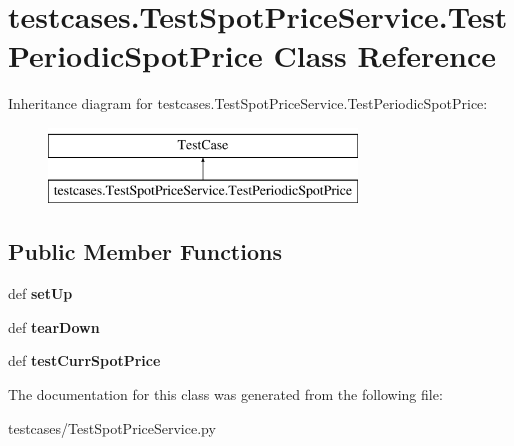 \hypertarget{classtestcases_1_1TestSpotPriceService_1_1TestPeriodicSpotPrice}{\section{testcases.\-Test\-Spot\-Price\-Service.\-Test\-Periodic\-Spot\-Price Class Reference}
\label{classtestcases_1_1TestSpotPriceService_1_1TestPeriodicSpotPrice}
}
Inheritance diagram for testcases.\-Test\-Spot\-Price\-Service.\-Test\-Periodic\-Spot\-Price\-:\begin{figure}[H]
\begin{center}
\leavevmode
\includegraphics[height=2.000000cm]{classtestcases_1_1TestSpotPriceService_1_1TestPeriodicSpotPrice}
\end{center}
\end{figure}
\subsection*{Public Member Functions}
\begin{DoxyCompactItemize}
\item 
\hypertarget{classtestcases_1_1TestSpotPriceService_1_1TestPeriodicSpotPrice_a829f8aaf88613f2900e72bfa7565fd83}{def {\bfseries set\-Up}}\label{classtestcases_1_1TestSpotPriceService_1_1TestPeriodicSpotPrice_a829f8aaf88613f2900e72bfa7565fd83}

\item 
\hypertarget{classtestcases_1_1TestSpotPriceService_1_1TestPeriodicSpotPrice_a79ad75f602b635f1ed810c58966baf8f}{def {\bfseries tear\-Down}}\label{classtestcases_1_1TestSpotPriceService_1_1TestPeriodicSpotPrice_a79ad75f602b635f1ed810c58966baf8f}

\item 
\hypertarget{classtestcases_1_1TestSpotPriceService_1_1TestPeriodicSpotPrice_a25e404917d027a1629942487119b9051}{def {\bfseries test\-Curr\-Spot\-Price}}\label{classtestcases_1_1TestSpotPriceService_1_1TestPeriodicSpotPrice_a25e404917d027a1629942487119b9051}

\end{DoxyCompactItemize}


The documentation for this class was generated from the following file\-:\begin{DoxyCompactItemize}
\item 
testcases/Test\-Spot\-Price\-Service.\-py\end{DoxyCompactItemize}
